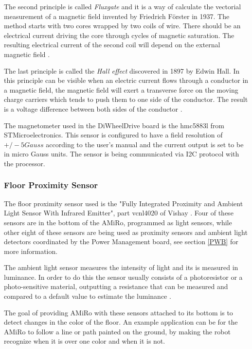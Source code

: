 \documentclass[12pt]{report}%
\begin{document}
The second principle is called \textit{Fluxgate} and it is a way of calculate the vectorial measurement of a magnetic field invented by Friedrich Förster in 1937. The method starts with two cores wrapped by two coils of wire. There should be an electrical current driving the core through cycles of magnetic saturation. The resulting electrical current of the second coil will depend on the external magnetic field \cite{AMiRo_ppt_v1}.

The last principle is called the \textit{Hall effect} discovered in 1897 by Edwin Hall. In this principle can be visible when an electric current flows through a conductor in a magnetic field, the magnetic field will exert a transverse force on the moving charge carriers which tends to push them to one side of the conductor. The result is a voltage difference between both sides of the conductor \cite{halleffect}.

The magnetometer used in the DiWheelDrive board is the hmc5883l from STMicroelectronics. This sensor is configured to have a field resolution of $+/-5Gauss$ according to the user's manual \cite{magnetometerpart} and the current output is set to be in micro Gauss units. The sensor is being communicated via I2C protocol with the processor.

\subsubsection{Floor Proximity Sensor}
\label{sec:AMS}
The floor proximity sensor used is the "Fully Integrated Proximity and Ambient Light Sensor With Infrared Emitter", part vcnl4020 of Vishay \cite{proxsensor}. Four of these sensors are in the bottom of the AMiRo, programmed as light sensors, while other eight of these sensors are being used as proximity sensors and ambient light detectors coordinated by the Power Management board, see section \ref{PWB} for more information.

The ambient light sensor measures the intensity of light and its is measured in luminance. In order to do this the sensor usually consists of a photoresistor or a photo-sensitive material, outputting a resistance that can be measured and compared to a default value to estimate the luminance \cite{amstheory}.

The goal of providing AMiRo with these sensors attached to its bottom is to detect changes in the color of the floor. An example application can be for the AMiRo to follow a line or path painted on the ground, by making the robot recognize when it is over one color and when it is not.
\end{document}
